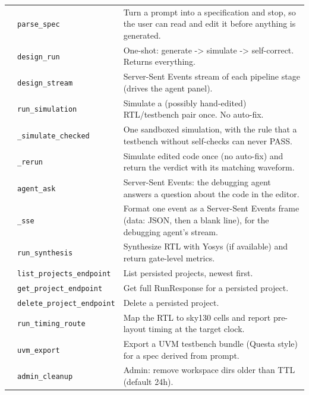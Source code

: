 \begin{longtable}{@{}p{2.8cm}>{\raggedright\arraybackslash}p{4.6cm}p{7.9cm}@{}}
{\small } & \texttt{\small parse\_\allowbreak{}spec} & Turn a prompt into a specification and stop, so the user can read and edit it before anything is generated. \\
{\small } & \texttt{\small design\_\allowbreak{}run} & One-shot: generate -\textgreater{} simulate -\textgreater{} self-correct. Returns everything. \\
{\small } & \texttt{\small design\_\allowbreak{}stream} & Server-Sent Events stream of each pipeline stage (drives the agent panel). \\
{\small } & \texttt{\small run\_\allowbreak{}simulation} & Simulate a (possibly hand-edited) RTL/testbench pair once. No auto-fix. \\
{\small } & \texttt{\small \_\allowbreak{}simulate\_\allowbreak{}checked} & One sandboxed simulation, with the rule that a testbench without self-checks can never PASS. \\
{\small } & \texttt{\small \_\allowbreak{}rerun} & Simulate edited code once (no auto-fix) and return the verdict with its matching waveform. \\
{\small } & \texttt{\small agent\_\allowbreak{}ask} & Server-Sent Events: the debugging agent answers a question about the code in the editor. \\
{\small } & \texttt{\small \_\allowbreak{}sse} & Format one event as a Server-Sent Events frame (data: JSON, then a blank line), for the debugging agent's stream. \\
{\small } & \texttt{\small run\_\allowbreak{}synthesis} & Synthesize RTL with Yosys (if available) and return gate-level metrics. \\
{\small } & \texttt{\small list\_\allowbreak{}projects\_\allowbreak{}endpoint} & List persisted projects, newest first. \\
{\small } & \texttt{\small get\_\allowbreak{}project\_\allowbreak{}endpoint} & Get full RunResponse for a persisted project. \\
{\small } & \texttt{\small delete\_\allowbreak{}project\_\allowbreak{}endpoint} & Delete a persisted project. \\
{\small } & \texttt{\small run\_\allowbreak{}timing\_\allowbreak{}route} & Map the RTL to sky130 cells and report pre-layout timing at the target clock. \\
{\small } & \texttt{\small uvm\_\allowbreak{}export} & Export a UVM testbench bundle (Questa style) for a spec derived from prompt. \\
{\small } & \texttt{\small admin\_\allowbreak{}cleanup} & Admin: remove workspace dirs older than TTL (default 24h). \\

\end{longtable}
